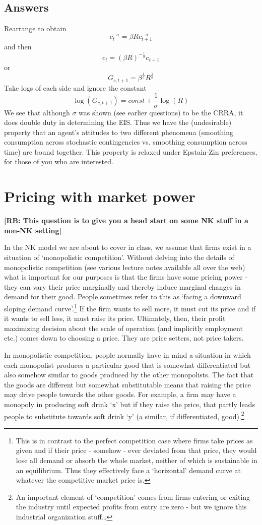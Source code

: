 \documentclass[authoryear,11pt]{elsarticle}
\begin{document}
\subsection*{Answers}
Rearrange to obtain
\[
c_{t}^{-\sigma} = \beta R c_{t+1}^{-\sigma}
\]
and then
\[
c_{t} = (\beta R)^{-\frac{1}{\sigma}} c_{t+1}
\]
or
\[
G_{c,t+1} = \beta^{\frac{1}{\sigma}} R^{\frac{1}{\sigma}}
\]
Take logs of each side and ignore the constant
\[
\log{(G_{c,t+1})} = const + \frac{1}{\sigma} \log{(R)}
\]
We see that although $\sigma$ was shown (see earlier questions) to be the CRRA, it does double duty in determining the EIS. Thus we have the (undesirable) property that an agent's attitudes to two different phenomena (smoothing consumption across stochastic contingencies vs. smoothing consumption across time) are bound together. This property is relaxed under Epstain-Zin preferences, for those of you who are interested.

\section{Pricing with market power}
\textbf{[RB: This question is to give you a head start on some NK stuff in a non-NK setting]}

In the NK model we are about to cover in class, we assume that firms exist in a situation of `monopolistic competition'. Without delving into the details of monopolistic competition (see various lecture notes available all over the web) what is important for our purposes is that the firms have some pricing power - they can vary their price marginally and thereby induce marginal changes in demand for their good. People sometimes refer to this as `facing a downward sloping demand curve'.\footnote{This is in contrast to the perfect competition case where firms take prices as given and if their price - somehow - ever deviated from that price, they would lose all demand or absorb the whole market, neither of which is sustainable in an equilibrium. Thus they effectively face a `horizontal' demand curve at whatever the competitive market price is.} If the firm wants to sell more, it must cut its price and if it wants to sell less, it must raise its price. Ultimately, then, their profit maximizing decision about the scale of operation (and implicitly employment etc.) comes down to choosing a price. They are price setters, not price takers.

In monopolistic competition, people normally have in mind a situation in which each monopolist produces a particular good that is somewhat differentiated but also somehow similar to goods produced by the other monopolists. The fact that the goods are different but somewhat substitutable means that raising the price may drive people towards the other goods. For example, a firm may have a monopoly in producing soft drink `x' but if they raise the price, that partly leads people to substitute towards soft drink `y' (a similar, if differentiated, good).\footnote{An important element of `competition' comes from firms entering or exiting the industry until expected profits from entry are zero - but we ignore this industrial organization stuff\ldots}
\end{document}
